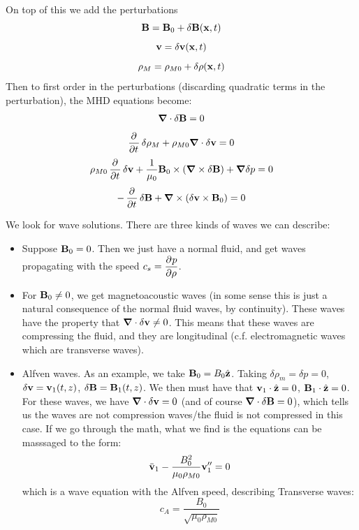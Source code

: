 On top of this we add the perturbations
\begin{equation}
    \mathbf{B} = \mathbf{B}_0 + \delta \mathbf{B}(\mathbf{x}, t)
\end{equation}
\begin{equation}
    \mathbf{v} = \delta\mathbf{v}(\mathbf{x}, t)
\end{equation}
\begin{equation}
    \rho_M = \rho_{M0} + \delta \rho(\mathbf{x}, t)
\end{equation}
Then to first order in the perturbations (discarding quadratic terms in the perturbation), the MHD equations become:
\begin{equation}
    \nabla \cdot \delta \v{B} = 0
\end{equation}
\begin{equation}
    \dpd{}{t}\delta \rho_{M} + \rho_{M0}\nabla \cdot \delta\v{v} = 0
\end{equation}
\begin{equation}
    \rho_{M0}\dpd{}{t}\delta \v{v} + \frac{1}{\mu_0}\v{B}_0 \times (\nabla \times \delta \v{B}) + \nabla \delta p = 0
\end{equation}
\begin{equation}
    -\dpd{}{t}\delta\v{B} + \nabla \times (\delta \v{v} \times \v{B}_0) = 0
\end{equation}

We look for wave solutions. There are three kinds of waves we can describe:
\begin{itemize}
    \item Suppose $\mathbf{B}_0 = 0$. Then we just have a normal fluid, and get waves propagating with the speed $c_s = \dpd{p}{\rho}$.
    \item For $\mathbf{B}_0 \neq 0$, we get magnetoacoustic waves (in some sense this is just a natural consequence of the normal fluid waves, by continuity). These waves have the property that $\nabla \cdot \delta \v{v} \neq 0$. This means that these waves are compressing the fluid, and they are longitudinal (c.f. electromagnetic waves which are transverse waves).
    \item Alfven waves. As an example, we take $\mathbf{B}_0 = B_0\hat{\mathbf{z}}$. Taking $\delta \rho_m = \delta p = 0$, $\delta \mathbf{v} = \mathbf{v}_1(t, z)$, $\delta \mathbf{B} = \mathbf{B}_1(t, z)$. We then must have that $\mathbf{v}_1 \cdot \hat{\mathbf{z}} = 0$, $\mathbf{B}_1 \cdot \hat{\mathbf{z}} = 0$. For these waves, we have $\nabla \cdot \delta \v{v} = 0$ (and of course $\nabla \cdot \delta \v{B} = 0$), which tells us the waves are not compression waves/the fluid is not compressed in this case. If we go through the math, what we find is the equations can be masssaged to the form:
    \begin{equation}
        \ddot{\mathbf{v}}_1 - \frac{B_0^2}{\mu_0\rho_{M0}}\mathbf{v}_1'' = 0
    \end{equation}
    which is a wave equation with the Alfven speed, describing Transverse waves:
    \begin{equation}
        c_A = \frac{B_0}{\sqrt{\mu_0 \rho_{M0}}}
    \end{equation}
\end{itemize}

